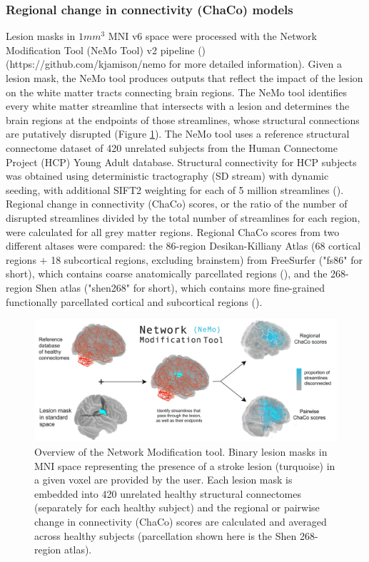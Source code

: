 \documentclass[10pt]{article}
\def\Plus{\texttt{+}}
\begin{document}
\subsubsection*{Regional change in connectivity (ChaCo) models}
Lesion masks in $1mm^3$ MNI v6 space were processed with the Network Modification Tool (NeMo Tool) v2 pipeline (\cite{Kuceyeski2013-nk}) (https://github.com/kjamison/nemo for more detailed information). Given a lesion mask, the NeMo tool produces outputs that reflect the impact of the lesion on the white matter tracts connecting brain regions. The NeMo tool identifies every white matter streamline that intersects with a lesion and determines the brain regions at the endpoints of those streamlines, whose structural connections are putatively disrupted (Figure \ref{nemo}). The NeMo tool uses a reference structural connectome dataset of 420 unrelated subjects from the Human Connectome Project (HCP) Young Adult database. Structural connectivity for HCP subjects was obtained using deterministic tractography (SD stream) with dynamic seeding, with additional SIFT2 weighting for each of 5 million streamlines (\cite{Smith2015-eb}). Regional change in connectivity (ChaCo) scores, or the ratio of the number of disrupted streamlines divided by the total number of streamlines for each region, were calculated for all grey matter regions. Regional ChaCo scores from two different altases were compared: the 86-region Desikan-Killiany Atlas (68 cortical regions $\Plus$ 18 subcortical regions, excluding brainstem) from FreeSurfer ("fs86" for short), which contains coarse anatomically parcellated regions (\cite{Desikan2006-vf,Fischl2002-lb}), and the 268-region Shen atlas ("shen268" for short), which contains more fine-grained functionally parcellated cortical and subcortical regions (\cite{Shen2013-zn}).

\begin{figure}[ht]
  \centering
  \includegraphics[width=1\linewidth]{figures/NeMo.png}
  \caption{Overview of the Network Modification tool. Binary lesion masks in MNI space representing the presence of a stroke lesion (turquoise) in a given voxel are provided by the user. Each lesion mask is embedded into 420 unrelated healthy structural connectomes (separately for each healthy subject) and the regional or pairwise change in connectivity (ChaCo) scores are calculated and averaged across healthy subjects (parcellation shown here is the Shen 268-region atlas). }
  \label{nemo}
\end{figure}
\end{document}
